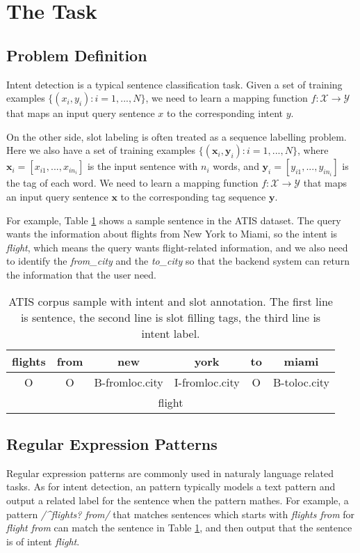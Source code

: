 \section{The Task}
\subsection{Problem Definition}
Intent detection is a typical sentence classification task. Given a set of training examples $\{(x_i, y_i): i=1,...,N\}$, we need to learn a mapping function $f: \mathcal{X} \rightarrow \mathcal{Y}$ that maps an input query sentence $x$ to the corresponding intent $y$.

On the other side, slot labeling is often treated as a sequence labelling problem. Here we also have a set of training examples $\{(\textbf{x}_i, \textbf{y}_i): i=1,...,N\}$, where $\textbf{x}_i=[x_{i1}, ..., x_{in_i}]$ is the input sentence with $n_i$ words, and $\textbf{y}_i=[y_{i1}, ..., y_{in_i}]$ is the tag of each word. We need to learn a mapping function $f: \mathcal{X} \rightarrow \mathcal{Y}$ that maps an input query sentence $\textbf{x}$ to the corresponding tag sequence $\textbf{y}$.

For example, Table \ref{atis_sample} shows a sample sentence in the ATIS dataset. The query wants the information about flights from New York to Miami, so the intent is \emph{flight}, which means the query wants flight-related information, and we also need to identify the \emph{from\_city} and the \emph{to\_city} so that the backend system can return the information that the user need.

\begin{table}
\setlength{\tabcolsep}{0.23em}
\centering
\small{
\begin{tabular}{|c|c|c|c|c|c|}

\hline
flights &from &new &york &to &miami  \\
\hline
O &O &B-fromloc.city &I-fromloc.city &O &B-toloc.city  \\
\hline
\multicolumn{6}{|c|}{flight} \\
\hline
\end{tabular}
}
\caption{ATIS corpus sample with intent and slot annotation. The first line is sentence, the second line is slot filling tags, the third line is intent label.}
\label{atis_sample}
\end{table}

\subsection{Regular Expression Patterns}
Regular expression patterns are commonly used in naturaly language related tasks. As for intent detection, an \RE pattern typically models a text pattern and output a related label for the sentence when the pattern mathes. For example, a pattern 
\textsl{/\textasciicircum flights? from/} that matches sentences which starts with \emph{flights from} for \emph{flight from} can match the sentence in Table \ref{atis_sample}, and then output that the sentence is of intent \emph{flight}.


